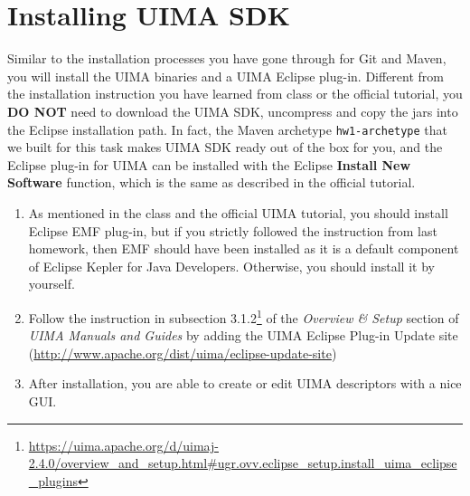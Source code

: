 
\section{Installing UIMA SDK}

Similar to the installation processes you have gone through for Git and Maven,
you will install the UIMA binaries and a UIMA Eclipse plug-in. Different from
the installation instruction you have learned from class or the official
tutorial, you \textbf{DO NOT} need to download the UIMA SDK, uncompress and copy
the jars into the Eclipse installation path. In fact, the Maven archetype
\verb|hw1-archetype| that we built for this task makes UIMA SDK ready out of the
box for you, and the Eclipse plug-in for UIMA can be installed with the Eclipse
\textbf{Install New Software} function, which is the same as described in the
official tutorial.

\begin{enumerate}

\item As mentioned in the class and the official UIMA tutorial, you should
install Eclipse EMF plug-in, but if you strictly followed the instruction from
last homework, then EMF should have been installed as it is a default component
of Eclipse Kepler for Java Developers. Otherwise, you should install it by
yourself.

\item Follow the instruction in subsection
3.1.2\footnote{\url{https://uima.apache.org/d/uimaj-2.4.0/overview_and_setup.html\#ugr.ovv.eclipse_setup.install_uima_eclipse_plugins}}
of the \emph{Overview \& Setup} section of \emph{UIMA Manuals and Guides} by
adding the UIMA Eclipse Plug-in Update site
(\url{http://www.apache.org/dist/uima/eclipse-update-site})

\item After installation, you are able to create or edit UIMA descriptors with a
nice GUI.
 
\end{enumerate}

